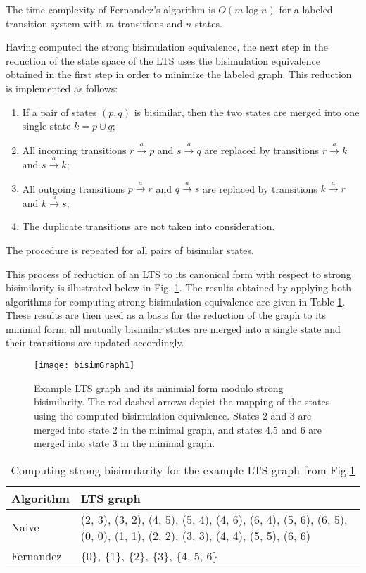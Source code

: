 The time complexity of Fernandez's algorithm is $O(m \log n)$ for a labeled transition system 
with $m$ transitions and $n$ states. 

Having computed the strong bisimulation equivalence, the next step in the reduction of the state space of the LTS uses the bisimulation equivalence obtained in the first step in order to minimize the labeled graph. This reduction is implemented as follows:
\begin{enumerate}
	\item If a pair of states $(p, q)$ is bisimilar, then the two states are merged into one single state $k=p\cup q$;
	\item All incoming transitions $r \stackrel{a}{\rightarrow} p$ and $s \stackrel{a}{\rightarrow} q$ are replaced by transitions $r \stackrel{a}{\rightarrow} k$ and $s \stackrel{a}{\rightarrow} k$;
	\item All outgoing transitions $p \stackrel{a}{\rightarrow} r$ and $q \stackrel{a}{\rightarrow} s$ are replaced by transitions $k \stackrel{a}{\rightarrow} r$ and $k \stackrel{a}{\rightarrow} s$;
	\item The duplicate transitions are not taken into consideration.
\end{enumerate}
The procedure is repeated for all pairs of bisimilar states.

This process of reduction of an LTS to its canonical form with respect to strong bisimilarity is illustrated below in Fig. \ref{fig:graph1}. The results obtained by applying both algorithms for computing strong bisimulation equivalence are given in Table \ref{table1}. These results are then used as a basis for the reduction of the graph to its minimal form: all mutually bisimilar states are merged into a single state and their transitions are updated accordingly. 

\begin{figure}[h]
	\centering
	\texttt{[image: bisimGraph1]}
	\caption{Example LTS graph and its minimial form modulo strong bisimilarity. The red dashed arrows depict the mapping of the states using the computed bisimulation equivalence. States 2 and 3 are merged into state 2 in the minimal graph, and states 4,5 and 6 are merged into state 3 in the minimal graph.}
	\label{fig:graph1}
\end{figure}

\begin{table}[h]
\begin{tabular}{| l | p{10.5cm}| }
  \hline                       
  Algorithm & LTS graph \\ \hline
  Naive & (2, 3), (3, 2), (4, 5), 
(5, 4), (4, 6), (6, 4), (5, 6), (6, 5), (0, 0), (1, 1), (2, 2), (3, 3), (4, 4), (5, 5), (6, 6) \\ \hline
  Fernandez & \{0\}, \{1\}, \{2\}, \{3\}, \{4, 5, 6\} \\ \hline  
\end{tabular}
\\
\caption{Computing strong bisimularity for the example LTS graph from Fig.\ref{fig:graph1}}
\label{table1}
\end{table}

